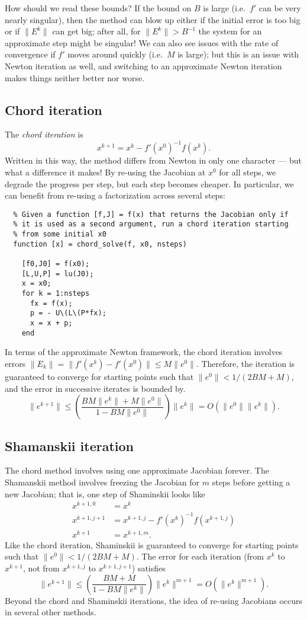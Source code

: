 \documentclass[12pt, leqno]{article} %
\begin{document}
How should we read these bounds?  If the bound on $B$ is large
(i.e.~$f'$ can be very nearly singular), then the method can blow up
either if the initial error is too big or if $\|E^k\|$ can get big;
after all, for $\|E^k\| > B^{-1}$ the system for an approximate step
might be singular!  We can also see issues with the rate of
convergence if $f'$ moves around quickly (i.e.~$M$ is large);
but this is an issue with Newton iteration as well, and switching to
an approximate Newton iteration makes things neither better nor worse.

\subsection*{Chord iteration}

The {\em chord iteration} is
\[
  x^{k+1} = x^k - f'(x^0)^{-1} f(x^k).
\]
Written in this way, the method differs from Newton in only one
character --- but what a difference it makes!  By re-using the
Jacobian at $x^0$ for all steps, we degrade the progress per step, but
each step becomes cheaper.  In particular, we can benefit from
re-using a factorization across several steps:
\begin{lstlisting}
  % Given a function [f,J] = f(x) that returns the Jacobian only if
  % it is used as a second argument, run a chord iteration starting
  % from some initial x0
  function [x] = chord_solve(f, x0, nsteps)

    [f0,J0] = f(x0);
    [L,U,P] = lu(J0);
    x = x0;
    for k = 1:nsteps
      fx = f(x);
      p = - U\(L\(P*fx);
      x = x + p;
    end
\end{lstlisting}

In terms of the approximate Newton framework, the chord iteration
involves errors $\|E_k\| = \|f'(x^k)-f'(x^0)\| \leq M \|e^0\|$.
Therefore, the iteration is guaranteed to converge for starting
points such that $\|e^0\| < 1/(2BM+M)$, and the error in successive
iterates is bounded by.
\[
  \|e^{k+1}\| \leq \left( \frac{BM\|e^k\| + M \|e^0\|}{1-BM\|e^0\|}
  \right) \|e^k\| = O(\|e^0\| \|e^k\|).
\]

\subsection*{Shamanskii iteration}

The chord method involves using one approximate Jacobian forever.
The Shamanskii method involves freezing the Jacobian for $m$ steps
before getting a new Jacobian; that is, one step of Shaminskii looks
like
\begin{align*}
  x^{k+1,0} & = x^k \\
  x^{k+1,j+1} &= x^{k+1,j} - f'(x^k)^{-1} f(x^{k+1,j}) \\
  x^{k+1} &= x^{k+1,m}.
\end{align*}
Like the chord iteration, Shaminskii is guaranteed to converge for
starting points such that $\|e^0\| < 1/(2BM+M)$.  The error for
each iteration (from $x^k$ to $x^{k+1}$, not from $x^{k+1,j}$ to
$x^{k+1,j+1}$) satisfies
\[
  \|e^{k+1}\|
  \leq \left( \frac{BM+M}{1-BM\|e^k\|} \right) \|e^{k}\|^{m+1}
  = O(\|e^k\|^{m+1}).
\]
Beyond the chord and Shaminskii iterations, the idea of re-using
Jacobians occurs in several other methods.
\end{document}
